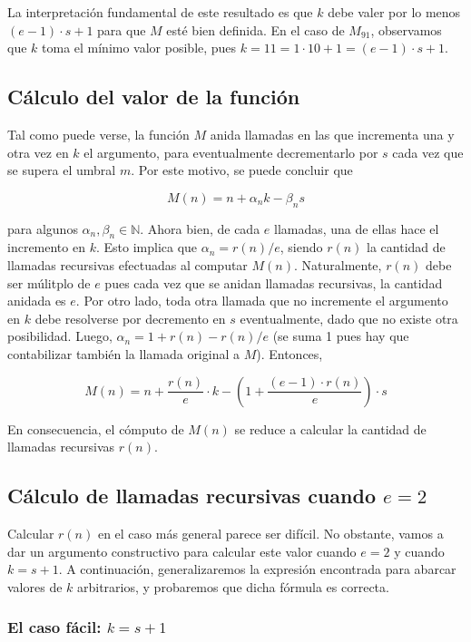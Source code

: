 \documentclass[a4paper,10pt]{article}
\newcommand{\Nat}{\ensuremath{\mathbb{N}}}
\begin{document}
La interpretaci\'on fundamental de este resultado es que $k$ debe valer por lo menos $(e-1)\cdot s + 1$ para que
$M$ est\'e bien definida. En el caso de $M_{91}$, observamos que $k$ toma el m\'inimo valor posible, pues
$k = 11 = 1 \cdot 10 + 1 = (e - 1) \cdot s + 1$.

\subsection{C\'alculo del valor de la funci\'on}

Tal como puede verse, la funci\'on $M$ anida llamadas en las que incrementa una y otra vez en $k$ el argumento, para
eventualmente decrementarlo por $s$ cada vez que se supera el umbral $m$. Por este motivo, se puede concluir que

$$M(n) = n + \alpha_n k - \beta_n s$$

para algunos $\alpha_n, \beta_n \in \Nat$. Ahora bien, de cada $e$ llamadas, una de ellas hace el incremento en $k$. Esto
implica que $\alpha_n = r(n) / e$, siendo $r(n)$ la cantidad de llamadas recursivas efectuadas al computar
$M(n)$. Naturalmente, $r(n)$ debe ser m\'ulitplo de $e$ pues cada vez que se anidan llamadas recursivas, la cantidad
anidada es $e$. Por otro lado, toda otra llamada que no incremente el argumento en $k$ debe resolverse
por decremento en $s$ eventualmente, dado que no existe otra posibilidad. Luego, $\alpha_n = 1 + r(n) - r(n)/e$ (se
suma 1 pues hay que contabilizar tambi\'en la llamada original a $M$). Entonces,

$$M(n) = n + \frac{r(n)}{e} \cdot k - \left(1 + \frac{(e-1) \cdot r(n)}{e}\right) \cdot s$$

En consecuencia, el c\'omputo de $M(n)$ se reduce a calcular la cantidad de llamadas recursivas $r(n)$. 

\subsection{C\'alculo de llamadas recursivas cuando $e = 2$}

Calcular $r(n)$ en el caso m\'as general parece ser dif\'icil. No obstante, vamos a dar un argumento constructivo
para calcular este valor cuando $e = 2$ y cuando $k = s + 1$. A continuaci\'on, generalizaremos la expresi\'on
encontrada para abarcar valores de $k$ arbitrarios, y probaremos que dicha f\'ormula es correcta.

\subsubsection{El caso f\'acil: $k = s + 1$}
\end{document}
